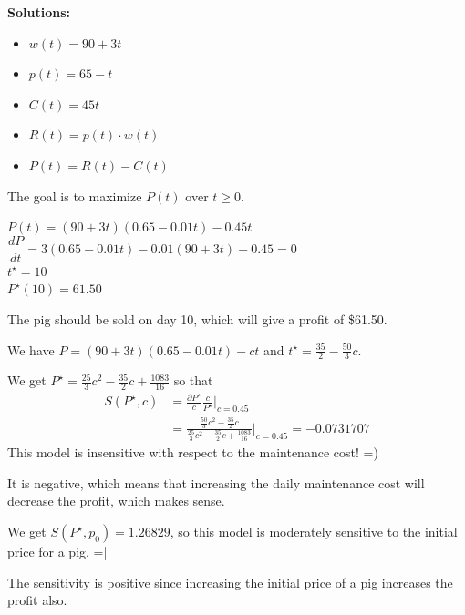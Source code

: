 \documentclass{workbook}
\begin{document}
\begin{solution}
\begin{slide}
\textbf{Solutions:}
\begin{parts}
	\item 
	\begin{itemize}
 		\item $w(t) = 90 + 3t$
 		\item $p(t) = 65-t$
 		\item $C(t) = 45t$
 		\item $R(t) = p(t) \cdot w(t)$
 		\item $P(t) = R(t) - C(t)$
 	\end{itemize}
 	\item The goal is to maximize $P(t)$ over $t\geq 0$.
 	\item 	$P(t) = (90+3t)(0.65-0.01t) - 0.45t$ \\
			$\dfrac{dP}{dt} = 3(0.65-0.01t)-0.01(90+3t) - 0.45 = 0$\\
 			$t^\star = 10$ \\	
 			$P^\star(10) = 61.50$
 	\item The pig should be sold on day 10, which will give a profit of \$61.50.

	\item We have $P = (90+3t)(0.65-0.01t) - ct$ and $t^\star = \frac{35}{2} - \frac{50}{3} c$.

		We get $P^\star = \frac{25}{3} c^2 - \frac{35}{2} c + \frac{1083}{16}$ so that
		\begin{align*}
		S(P^\star,c) 
			& = \frac{\partial P^\star}{c} \frac{c}{P^\star} \big|_{c=0.45} \\
			& = \frac{\frac{50}{3} c^2 - \frac{35}{2}c}{\frac{25}{3} c^2 - \frac{35}{2} c + \frac{1083}{16}}\big|_{c=0.45}
			= -0.0731707
		\end{align*}
		This model is insensitive with respect to the maintenance cost! =)
	\item It is negative, which means that increasing the daily maintenance cost will decrease the profit, which makes sense.
	
	\item We get $S(P^\star,p_0) = 1.26829$, so
%
%
		this model is moderately sensitive to the initial price for a pig. =|
		
	\item The sensitivity is positive since increasing the initial price of a pig increases the profit also.
	
\end{parts}


	
\end{slide}	

\end{solution}
\end{document}
